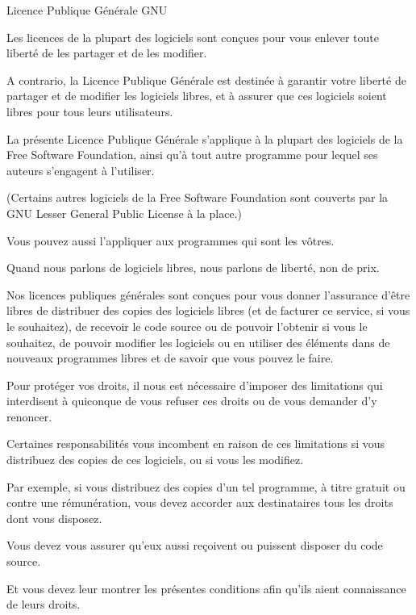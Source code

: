 {\small
	
	\begin{center}
	
Licence Publique Générale GNU

	\end{center}

Les licences de la plupart des logiciels sont conçues pour vous enlever toute liberté de les partager et de les modifier.

A contrario, la Licence Publique Générale est destinée à garantir votre liberté de partager et de modifier les logiciels libres, et à assurer que ces logiciels soient libres pour tous leurs utilisateurs.

La présente Licence Publique Générale s'applique à la plupart des logiciels de la Free Software Foundation, ainsi qu'à tout autre programme pour lequel ses auteurs s'engagent à l'utiliser.

(Certains autres logiciels de la Free Software Foundation sont couverts par la GNU Lesser General Public License à la place.)

Vous pouvez aussi l'appliquer aux programmes qui sont les vôtres.

Quand nous parlons de logiciels libres, nous parlons de liberté, non de prix.

Nos licences publiques générales sont conçues pour vous donner l'assurance d'être libres de distribuer des copies des logiciels libres (et de facturer ce service, si vous le souhaitez), de recevoir le code source ou de pouvoir l'obtenir si vous le souhaitez, de pouvoir modifier les logiciels ou en utiliser des éléments dans de nouveaux programmes libres et de savoir que vous pouvez le faire.

Pour protéger vos droits, il nous est nécessaire d'imposer des limitations qui interdisent à quiconque de vous refuser ces droits ou de vous demander d'y renoncer.

Certaines responsabilités vous incombent en raison de ces limitations si vous distribuez des copies de ces logiciels, ou si vous les modifiez.

Par exemple, si vous distribuez des copies d'un tel programme, à titre gratuit ou contre une rémunération, vous devez accorder aux destinataires tous les droits dont vous disposez.

Vous devez vous assurer qu'eux aussi reçoivent ou puissent disposer du code source.

Et vous devez leur montrer les présentes conditions afin qu'ils aient connaissance de leurs droits.

}
